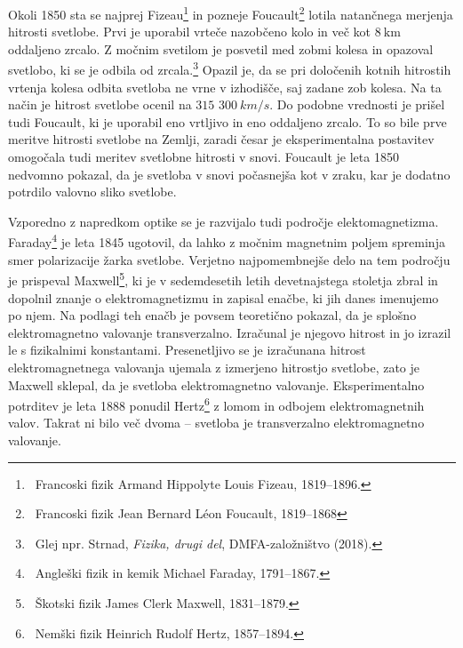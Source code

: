 Okoli 1850 sta se najprej Fizeau\footnote{~Francoski fizik Armand Hippolyte
Louis Fizeau, 1819--1896.} in pozneje Foucault\footnote{~Francoski fizik
Jean Bernard L\'{e}on Foucault, 1819--1868} lotila natančnega
merjenja hitrosti svetlobe. Prvi je uporabil vrteče nazobčeno kolo 
in več kot $8~\si{\kilo\meter}$ oddaljeno zrcalo. Z močnim svetilom je posvetil med
zobmi kolesa in opazoval svetlobo, ki se je odbila od 
zrcala.\footnote{~Glej npr. Strnad, {\it Fizika, drugi del}, 
DMFA-založništvo (2018).} Opazil je, da se pri določenih kotnih hitrostih 
vrtenja kolesa odbita svetloba ne vrne v izhodišče, saj zadane zob kolesa. 
Na ta način je hitrost svetlobe ocenil na $315\,\,300~\si{km/s}$. Do podobne
vrednosti je prišel tudi Foucault, ki je uporabil eno vrtljivo in eno oddaljeno 
zrcalo. To so bile prve meritve hitrosti svetlobe na Zemlji, zaradi česar
je eksperimentalna postavitev omogočala tudi meritev 
svetlobne hitrosti v snovi. Foucault je leta 1850 nedvomno pokazal, 
da je svetloba v snovi počasnejša kot v zraku, kar je dodatno
potrdilo valovno sliko svetlobe. 

Vzporedno z napredkom optike se je razvijalo tudi področje
elektomagnetizma. Faraday\footnote{~Angleški fizik in kemik Michael Faraday, 1791--1867.} 
je leta 1845 ugotovil, da lahko z močnim magnetnim poljem spreminja
smer polarizacije žarka svetlobe. Verjetno najpomembnejše delo
na tem področju je prispeval Maxwell\footnote{~Škotski fizik James Clerk Maxwell, 
1831--1879.}, ki je v sedemdesetih letih devetnajstega stoletja
zbral in dopolnil znanje o elektromagnetizmu in zapisal enačbe, ki jih 
danes imenujemo po njem. Na podlagi teh enačb je povsem 
teoretično pokazal, da je splošno elektromagnetno valovanje 
transverzalno. Izračunal je njegovo hitrost in jo
izrazil le s fizikalnimi konstantami. Presenetljivo se je izračunana 
hitrost elektromagnetnega valovanja ujemala 
z izmerjeno hitrostjo svetlobe, zato je Maxwell sklepal, da je svetloba 
elektromagnetno valovanje. Eksperimentalno potrditev je leta
1888 ponudil Hertz\footnote{~Nemški fizik 
Heinrich Rudolf Hertz, 1857--1894.} z lomom in odbojem elektromagnetnih 
valov. Takrat ni bilo več dvoma -- svetloba je transverzalno 
elektromagnetno valovanje. 


